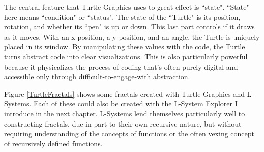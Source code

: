 \documentclass[12pt,twoside]{reedthesis}
\begin{document}
	
	The central feature that Turtle Graphics uses to great effect is ``state". ``State" here means ``condition" or ``status". The state of the ``Turtle" is its position, rotation, and whether its ``pen" is up or down. This last part controls if it draws as it moves. With an x-position, a y-position, and an angle, the Turtle is uniquely placed in its window. By manipulating these values with the code, the Turtle turns abstract code into clear visualizations. This is also particularly powerful because it physicalizes the process of coding that's often purely digital and accessible only through difficult-to-engage-with abstraction.
	
	Figure \ref{TurtleFractals} shows some fractals created with Turtle Graphics and L-Systems. Each of these could also be created with the L-System Explorer I introduce in the next chapter. L-Systems lend themselves particularly well to constructing fractals, due in part to their own recursive nature, but without requiring understanding of the concepts of functions or the often vexing concept of recursively defined functions.
	
\end{document}
